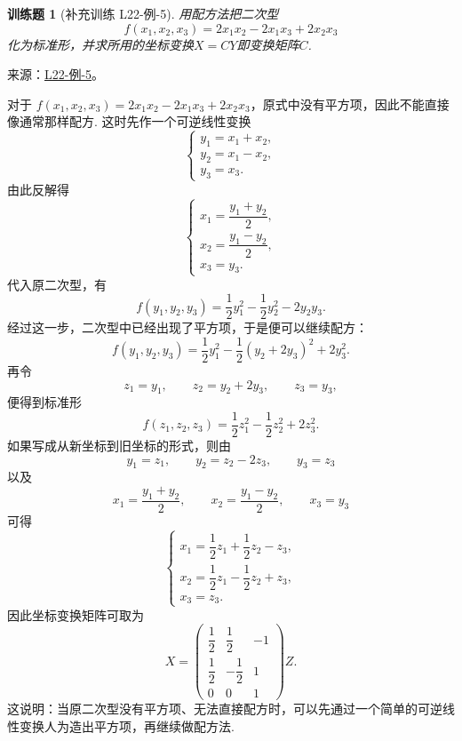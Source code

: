 \documentclass[UTF8,12pt,a4paper,fontset=fandol]{ctexart}
\newtheorem{exercise}{训练题}[section]
\begin{document}
\begin{exercise}[补充训练 L22-例-5]\label{prob:L22-例-5}
用配方法把二次型
    \[f(x_1,x_2,x_3)=2x_1x_2-2x_1x_3+2x_2x_3\]
    化为标准形，并求所用的坐标变换$X=CY$即变换矩阵$C$.
\end{exercise}
\noindent 来源：\href{https://github.com/yhwu-is/Linear-Algebra-Left-Undone/blob/new/%E8%AE%B2%E4%B9%89/%E4%B8%93%E9%A2%98/22%20%E4%BA%8C%E6%AC%A1%E5%9E%8B.tex}{L22-例-5}。
\begin{solve}
对于 $f(x_1,x_2,x_3)=2x_1x_2-2x_1x_3+2x_2x_3$，原式中没有平方项，因此不能直接像通常那样配方. 这时先作一个可逆线性变换
    \[
        \begin{cases}
            y_1 = x_1+x_2, \\
            y_2 = x_1-x_2, \\
            y_3 = x_3.
        \end{cases}
    \]
    由此反解得
    \[
        \begin{cases}
            x_1 = \dfrac{y_1+y_2}{2}, \\
            x_2 = \dfrac{y_1-y_2}{2}, \\
            x_3 = y_3.
        \end{cases}
    \]
    代入原二次型，有
    \[ f(y_1, y_2, y_3) = \frac{1}{2}y_1^2-\frac{1}{2}y_2^2-2y_2y_3. \]
    经过这一步，二次型中已经出现了平方项，于是便可以继续配方：
    \[ f(y_1, y_2, y_3) = \frac{1}{2}y_1^2-\frac{1}{2}(y_2+2y_3)^2+2y_3^2. \]
    再令
    \[
        z_1=y_1,\qquad z_2=y_2+2y_3,\qquad z_3=y_3,
    \]
    便得到标准形
    \[
        f(z_1,z_2,z_3)=\frac{1}{2}z_1^2-\frac{1}{2}z_2^2+2z_3^2.
    \]
    如果写成从新坐标到旧坐标的形式，则由
    \[
        y_1=z_1,\qquad y_2=z_2-2z_3,\qquad y_3=z_3
    \]
    以及
    \[
        x_1=\frac{y_1+y_2}{2},\qquad x_2=\frac{y_1-y_2}{2},\qquad x_3=y_3
    \]
    可得
    \[
        \begin{cases}
            x_1 = \dfrac{1}{2}z_1+\dfrac{1}{2}z_2-z_3, \\
            x_2 = \dfrac{1}{2}z_1-\dfrac{1}{2}z_2+z_3, \\
            x_3 = z_3.
        \end{cases}
    \]
    因此坐标变换矩阵可取为
    \[
        X=
        \begin{pmatrix}
            \dfrac{1}{2} & \dfrac{1}{2} & -1 \\
            \dfrac{1}{2} & -\dfrac{1}{2} & 1 \\
            0 & 0 & 1
        \end{pmatrix}
        Z.
    \]
    这说明：当原二次型没有平方项、无法直接配方时，可以先通过一个简单的可逆线性变换人为造出平方项，再继续做配方法.
\end{solve}
\end{document}
